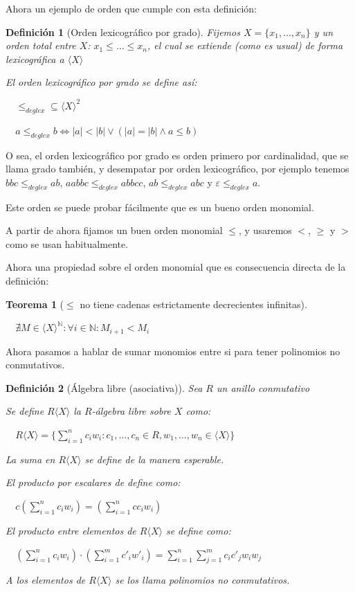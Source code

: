 \documentclass{amsbook}
\theoremstyle{customstyle}
\newtheorem{definition}{Definición}[section]
\newtheorem{theorem}{Teorema}[section]
\begin{document}
Ahora un ejemplo de orden que cumple con esta definición:

\begin{definition}[Orden lexicográfico por grado]
Fijemos $X = \{x_1, …, x_n\}$ y un orden total entre $X$: $x_1 ≤ … ≤ x_n$, el cual se extiende (como es usual) de forma lexicográfica a $⟨X⟩$

El orden lexicográfico por grado se define así:

  $≤_{deglex} ⊆ ⟨X⟩^2$

  $a ≤_{deglex} b ⇔ |a| < |b| ∨ (|a| = |b| ∧ a ≤ b)$
\end{definition}

O sea, el orden lexicográfico por grado es orden primero por cardinalidad, que se llama grado también, y desempatar por orden lexicográfico, por ejemplo tenemos $bbc ≤_{deglex} ab$, $aabbc ≤_{deglex} abbcc$, $ab ≤_{deglex} abc$ y $ε ≤_{deglex} a$.

Este orden se puede probar fácilmente que es un bueno orden monomial.

A partir de ahora fijamos un buen orden monomial $≤$, y usaremos $<$, $≥$ y $>$ como se usan habitualmente.

Ahora una propiedad sobre el orden monomial que es consecuencia directa de la definición:

\begin{theorem}[$≤$ no tiene cadenas estrictamente decrecientes infinitas]\label{thm:< no cadenas dec inf}\

  $∄M ∈ ⟨X⟩^ℕ : ∀i ∈ ℕ : M_{i + 1} < M_i$

\end{theorem}

Ahora pasamos a hablar de sumar monomios entre si para tener polinomios no conmutativos.

\begin{definition}[Álgebra libre (asociativa)]
Sea $R$ un anillo conmutativo

Se define $R⟨X⟩$ la $R$-álgebra libre sobre $X$ como:

  $R⟨X⟩ = \{\sum_{i = 1}^n c_i w_i : c_1, …, c_n ∈ R, w_1, …, w_n ∈ ⟨X⟩\}$

La suma en $R⟨X⟩$ se define de la manera esperable.

El producto por escalares de define como:

  $c (\sum_{i = 1}^n c_i w_i) = (\sum_{i = 1}^n c c_i w_i)$

El producto entre elementos de $R⟨X⟩$ se define como:

  $(\sum_{i = 1}^n c_i w_i) · (\sum_{i = 1}^m c'_i w'_i) = \sum_{i = 1}^n \sum_{j = 1}^m c_i c'_j w_i w_j$

A los elementos de $R⟨X⟩$ se los llama polinomios no conmutativos.
\end{definition}
\end{document}
